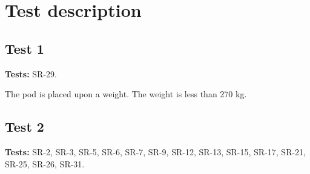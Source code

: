 \documentclass[Main]{subfiles}
\begin{document}
\chapter{Test description}

\section{Test 1}

\textbf{Tests: } SR-29.

\begin{TestCaseIntro}
\end{TestCaseIntro}

\begin{TestCase}
\TC
{The pod is placed upon a weight.}
{The weight is less than 270 kg.}

\end{TestCase}


\newpage
\section{Test 2}

\textbf{Tests:} SR-2, SR-3, SR-5, SR-6, SR-7, SR-9, SR-12, SR-13, SR-15, SR-17, SR-21, SR-25, SR-26, SR-31.

\vspace{-15pt}
\end{document}
